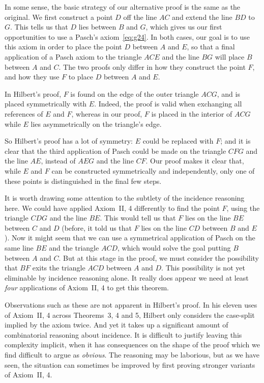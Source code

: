 In some sense, the basic strategy of our alternative proof is the same as the original. We first construct a point $D$ off the line $AC$ and extend the line $BD$ to $G$. This tells us that $D$ lies between $B$ and $G$, which gives us our first opportunities to use a Pasch's axiom~\eqref{eq:g24}. In both cases, our goal is to use this axiom in order to place the point $D$ between $A$ and $E$, so that a final application of a Pasch axiom to the triangle $ACE$ and the line $BG$ will place $B$ between $A$ and $C$. The two proofs only differ in how they construct the point $F$, and how they use $F$ to place $D$ between $A$ and $E$.

In Hilbert's proof, $F$ is found on the edge of the outer triangle $ACG$, and is placed symmetrically with $E$. Indeed, the proof is valid when exchanging all references of $E$ and $F$, whereas in our proof, $F$ is placed in the interior of $ACG$ while $E$ lies asymmetrically on the triangle's edge. 

So Hilbert's proof has a lot of symmetry: $E$ could be replaced with $F$; and it is clear that the third application of Pasch could be made on the triangle $CFG$ and the line $AE$, instead of $AEG$ and the line $CF$. Our proof makes it clear that, while $E$ and $F$ can be constructed symmetrically and independently, only one of these points is distinguished in the final few steps. 

It is worth drawing some attention to the subtlety of the incidence reasoning here. We could have applied Axiom~II, 4 differently to find the point $F$, using the triangle $CDG$ and the line $BE$. This would tell us that $F$ lies on the line $BE$ between $C$ and $D$ (before, it told us that $F$ lies on the line $CD$ between $B$ and $E$). Now it might seem that we can use a symmetrical application of Pasch on the same line $BE$ and the triangle $ACD$, which would solve the goal putting $B$ between $A$ and $C$. But at this stage in the proof, we must consider the possibility that $BF$ exits the triangle $ACD$ between $A$ and $D$. This possibility is not yet eliminable by incidence reasoning alone. It really does appear we need at least \emph{four} applications of Axiom~II, 4 to get this theorem.

Observations such as these are not apparent in Hilbert's proof. In his eleven uses of Axiom~II, 4 across Theorems~3, 4 and 5, Hilbert only considers the case-split implied by the axiom twice. And yet it takes up a significant amount of combinatorial reasoning about incidence. It is difficult to justify leaving this complexity implicit, when it has consequences on the shape of the proof which we find difficult to argue as \emph{obvious}. The reasoning may be laborious, but as we have seen, the situation can sometimes be improved by first proving stronger variants of Axiom~II, 4.

